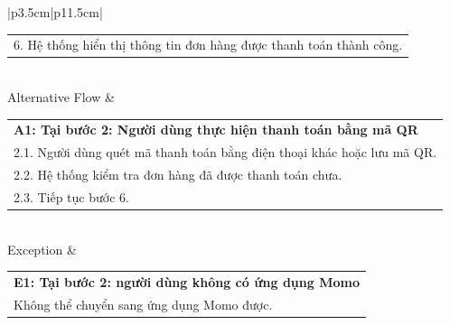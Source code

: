 \begin{enumerate}[a. ]
\begin{longtable}{|p{3.5cm}|p{11.5cm}|}
\begin{tabular}[c]{@{}p{\linewidth}}
            6. Hệ thống hiển thị thông tin đơn hàng được thanh toán thành công.\\
        \end{tabular} \\ \hline
        Alternative Flow &
          \begin{tabular}[c]{@{}p{\linewidth}} 
          \textbf{A1: Tại bước 2: Người dùng thực hiện thanh toán bằng mã QR}\\
           2.1. Người dùng quét mã thanh toán bằng điện thoại khác hoặc lưu mã QR.\\
           2.2. Hệ thống kiểm tra đơn hàng đã được thanh toán chưa. \\
           2.3. Tiếp tục bước 6.
        \end{tabular} \\ \hline
        Exception & \begin{tabular}[c]{@{}p{\linewidth}}
            \textbf{E1: Tại bước 2: người dùng không có ứng dụng Momo}\\
            Không thể chuyển sang ứng dụng Momo được.
        \end{tabular}\\ 
        \hline
        \caption{Use-case thanh toán ví điện tử}
    \end{longtable}
    

\end{enumerate}
